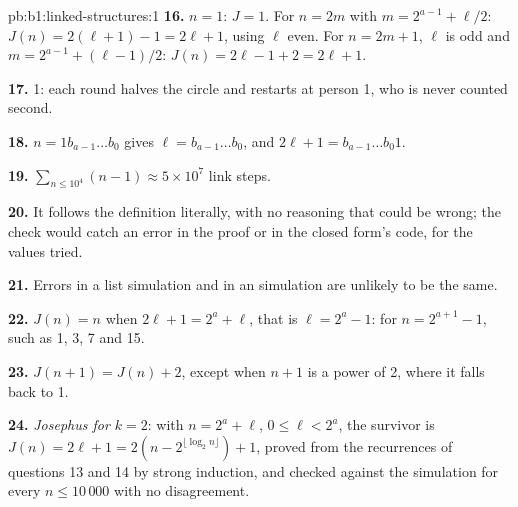 \begin{solution}{pb:b1:linked-structures:1}
\textbf{16.} $n = 1$: $J = 1$. For $n = 2m$ with $m = 2^{a - 1} + \ell/2$: $J(n) = 2(\ell + 1) - 1 = 2\ell + 1$, using
$\ell$ even. For $n = 2m + 1$, $\ell$ is odd and $m = 2^{a - 1} + (\ell - 1)/2$: $J(n) = 2\ell - 1 + 2 = 2\ell + 1$.

\textbf{17.} 1: each round halves the circle and restarts at person 1, who is never counted second.

\textbf{18.} $n = 1b_{a-1}\dots b_0$ gives $\ell = b_{a-1}\dots b_0$, and $2\ell + 1 = b_{a-1}\dots b_0 1$.

\textbf{19.} $\sum_{n \leq 10^4} (n - 1) \approx 5 \times 10^7$ link steps.

\textbf{20.} It follows the definition literally, with no reasoning that could be wrong; the check would catch an error
in the proof or in the closed form's code, for the values tried.

\textbf{21.} Errors in a list simulation and in an  simulation are unlikely to be the same.

\textbf{22.} $J(n) = n$ when $2\ell + 1 = 2^a + \ell$, that is $\ell = 2^a - 1$: for $n = 2^{a + 1} - 1$, such as 1, 3, 7
and 15.

\textbf{23.} $J(n + 1) = J(n) + 2$, except when $n + 1$ is a power of 2, where it falls back to 1.

\textbf{24.} \emph{Josephus for $k = 2$}: with $n = 2^a + \ell$, $0 \leq \ell < 2^a$, the survivor is $J(n) = 2\ell + 1 =
2(n - 2^{\lfloor \log_2 n \rfloor}) + 1$, proved from the recurrences of questions 13 and 14 by strong induction, and
checked against the simulation for every $n \leq 10\,000$ with no disagreement.
\end{solution}
